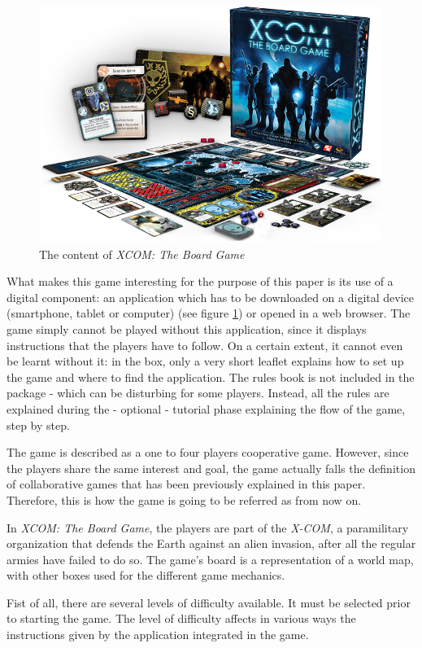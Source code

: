\begin{figure}[!ht]
    \centering
    \includegraphics[scale=0.5]{Images/xc01_layout.png}
    \caption{The content of \textit{XCOM: The Board Game}}
    \label{fig:XCOMBG}
\end{figure}

What makes this game interesting for the purpose of this paper is its use of a digital component: an application which has to be downloaded on a digital device (smartphone, tablet or computer) (see figure \ref{fig:XCOMBG}) or opened in a web browser. The game simply cannot be played without this application, since it displays instructions that the players have to follow. On a certain extent, it cannot even be learnt without it: in the box, only a very short leaflet explains how to set up the game and where to find the application. The rules book is not included in the package - which can be disturbing for some players. Instead, all the rules are explained during the - optional - tutorial phase explaining the flow of the game, step by step. 

The game is described as a one to four players cooperative game. However, since the players share the same interest and goal, the game actually falls the definition of collaborative games that has been previously explained in this paper. Therefore, this is how the game is going to be referred as from now on.

In \textit{XCOM: The Board Game}, the players are part of the \textit{X-COM}, a paramilitary organization that defends the Earth against an alien invasion, after all the regular armies have failed to do so. The game's board is a representation of a world map, with other boxes used for the different game mechanics.

Fist of all, there are several levels of difficulty available. It must be selected prior to starting the game. The level of difficulty affects in various ways the instructions given by the application integrated in the game.

